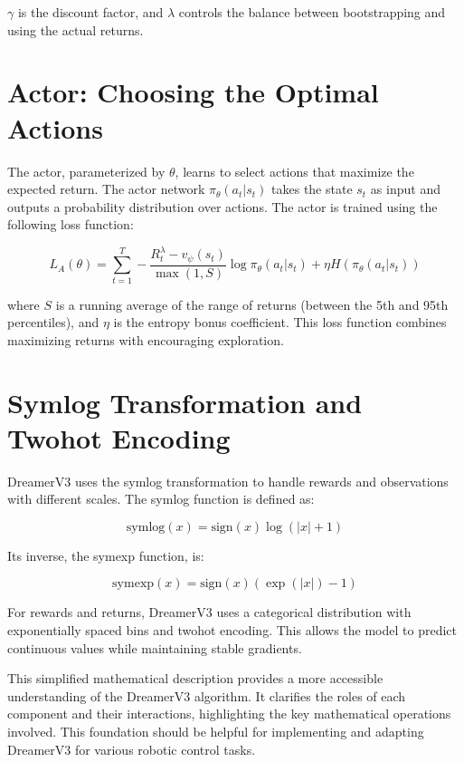 $\gamma$ is the discount factor, and $\lambda$ controls the balance between bootstrapping and using the actual returns.

\section{Actor: Choosing the Optimal Actions}

The actor, parameterized by $\theta$, learns to select actions that maximize the expected return. The actor network $\pi_\theta(a_t | s_t)$ takes the state $s_t$ as input and outputs a probability distribution over actions. The actor is trained using the following loss function:

\begin{equation}
L_A(\theta) = \sum_{t=1}^T - \frac{R_t^\lambda - v_\psi(s_t)}{\max(1, S)} \log \pi_\theta(a_t | s_t) + \eta H(\pi_\theta(a_t | s_t))
\end{equation}

where $S$ is a running average of the range of returns (between the 5th and 95th percentiles), and $\eta$ is the entropy bonus coefficient.  This loss function combines maximizing returns with encouraging exploration.

\section{Symlog Transformation and Twohot Encoding}

DreamerV3 uses the symlog transformation to handle rewards and observations with different scales. The symlog function is defined as:

\begin{equation}
\text{symlog}(x) = \text{sign}(x) \log(|x| + 1)
\end{equation}

Its inverse, the symexp function, is:

\begin{equation}
\text{symexp}(x) = \text{sign}(x) (\exp(|x|) - 1)
\end{equation}

For rewards and returns, DreamerV3 uses a categorical distribution with exponentially spaced bins and twohot encoding.  This allows the model to predict continuous values while maintaining stable gradients.

This simplified mathematical description provides a more accessible understanding of the DreamerV3 algorithm.  It clarifies the roles of each component and their interactions, highlighting the key mathematical operations involved.  This foundation should be helpful for implementing and adapting DreamerV3 for various robotic control tasks.